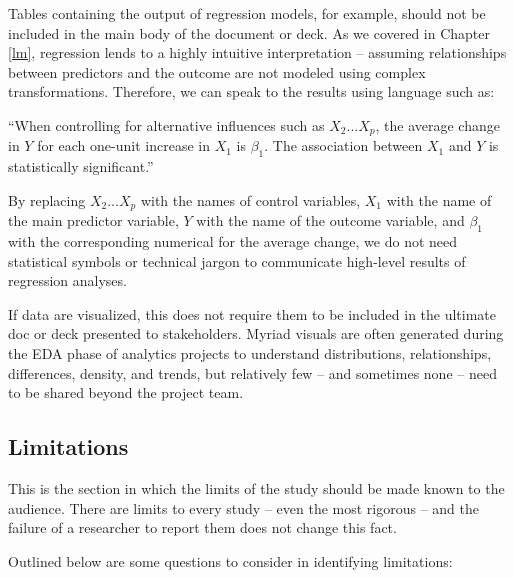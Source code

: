 \documentclass[
]{book}
\begin{document}
Tables containing the output of regression models, for example, should not be included in the main body of the document or deck. As we covered in Chapter \ref{lm}, regression lends to a highly intuitive interpretation -- assuming relationships between predictors and the outcome are not modeled using complex transformations. Therefore, we can speak to the results using language such as:

``When controlling for alternative influences such as \(X_2 ... X_p\), the average change in \(Y\) for each one-unit increase in \(X_1\) is \(\beta_1\). The association between \(X_1\) and \(Y\) is statistically significant.''

By replacing \(X_2 ... X_p\) with the names of control variables, \(X_1\) with the name of the main predictor variable, \(Y\) with the name of the outcome variable, and \(\beta_1\) with the corresponding numerical for the average change, we do not need statistical symbols or technical jargon to communicate high-level results of regression analyses.

If data are visualized, this does not require them to be included in the ultimate doc or deck presented to stakeholders. Myriad visuals are often generated during the EDA phase of analytics projects to understand distributions, relationships, differences, density, and trends, but relatively few -- and sometimes none -- need to be shared beyond the project team.

\hypertarget{limitations}{%
\subsection{Limitations}\label{limitations}}

This is the section in which the limits of the study should be made known to the audience. There are limits to every study -- even the most rigorous -- and the failure of a researcher to report them does not change this fact.

Outlined below are some questions to consider in identifying limitations:
\end{document}

